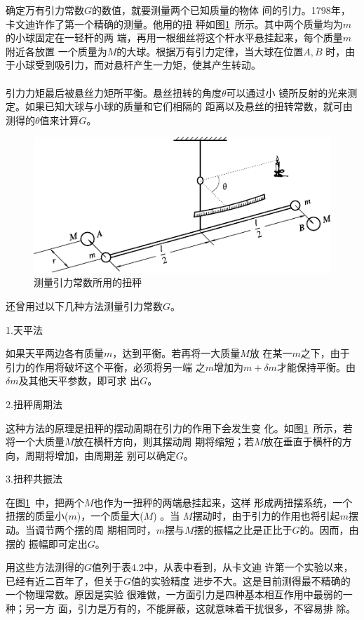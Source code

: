 确定万有引力常数$ G $的数值，就要测量两个已知质量的物体
间的引力。1798年，卡文迪许作了第一个精确的测量。他用的扭
秤如图\ref{fig:04.04}~所示。其中两个质量均为$ m $的小球固定在一轻杆的两
端，再用一根细丝将这个杆水平悬挂起来，每个质量$ m $附近各放置
一个质量为$ M $的大球。根据万有引力定律，当大球在位置$ A , B $
时，由于小球受到吸引力，而对悬杆产生一力矩，使其产生转动。\\~\\
引力力矩最后被悬丝力矩所平衡。悬丝扭转的角度$ \theta $可以通过小
镜所反射的光来测定。如果已知大球与小球的质量和它们相隔的
距离以及悬丝的扭转常数，就可由测得的$ \theta $值来计算$ G $。
\begin{figure}[h]
  \centering
  \includegraphics{figure/fig04.04}
  \caption{测量引力常数所用的扭秤}
  \label{fig:04.04}
\end{figure}

还曾用过以下几种方法测量引力常数$ G $。

\textsf{1.天平法}

如果天平两边各有质量$ m $，达到平衡。若再将一大质量$ M $放
在某一$ m $之下，由于引力的作用将破坏这个平衡，必须将另一端
之$ m $增加为$ m + \delta m $才能保持平衡。由$ \delta m $及其他天平参数，即可求
出$ G $。

\textsf{2.扭秤周期法}

这种方法的原理是扭秤的摆动周期在引力的作用下会发生变
化。如图\ref{fig:04.04}~所示，若将一个大质量$ M $放在横杆方向，则其摆动周
期将缩短；若$ M $放在垂直于横杆的方向，周期将增加，由周期差
别可以确定$ G $。

\textsf{3.扭秤共振法}

在图\ref{fig:04.04}~中，把两个$ M $也作为一扭秤的两端悬挂起来，这样
形成两扭摆系统，一个扭摆的质量小($ m $)，一个质量大($ M $) 。当
$ M $摆动时，由于引力的作用也将引起$ m $摆动。当调节两个摆的周
期相同时，$ m $摆与$ M $摆的振幅之比是正比于$ G $的。因而，由摆的
振幅即可定出$ G $。

用这些方法测得的$ G $值列于表4.2中，从表中看到，从卡文迪
许第一个实验以来，已经有近二百年了，但关于$ G $值的实验精度
进步不大。这是目前测得最不精确的一个物理常数。原因是实验
很难做，一方面引力是四种基本相互作用中最弱的一种；另一方
面，引力是万有的，不能屏蔽，这就意味着干扰很多，不容易排
除。

